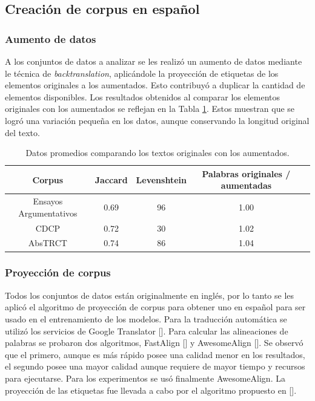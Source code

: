 \subsection{Creación de corpus en español}

\subsubsection{Aumento de datos}

A los conjuntos de datos a analizar se les realizó un aumento de datos mediante le técnica de \emph{backtranslation},
aplicándole la proyección de etiquetas de los elementos originales a los aumentados.
Esto contribuyó a duplicar la cantidad de elementos disponibles. Los resultados obtenidos al comparar los 
elementos originales con los aumentados se reflejan en la Tabla \ref{table:data_augmentation}.
Estos muestran que se logró una variación pequeña en los datos, aunque conservando la 
longitud original del texto. 

\begin{table}[h!]
	\begin{center}
		\begin{tabular}{|c|c|c|c|c|} \hline
		Corpus		            &  Jaccard	& Levenshtein	& Palabras originales / aumentadas   \\ \hline
        Ensayos Argumentativos	&  0.69		                & 96		                    & 1.00	  \\ \hline
		CDCP                    &  0.72	                    & 30		                    & 1.02	  \\ \hline
        AbsTRCT                 &  0.74		                & 86		                    & 1.04	  \\ \hline
		\end{tabular}
	\caption{Datos promedios comparando los textos originales con los aumentados.}\label{table:data_augmentation}
	\end{center}
\end{table}

\subsubsection{Proyección de corpus}

Todos los conjuntos de datos están originalmente en inglés, por lo tanto se les aplicó el algoritmo de proyección
de corpus para obtener uno en español para ser usado en el entrenamiento de los modelos. 
Para la traducción automática se utilizó los servicios de Google Translator [\cite{translateGoogle}]. Para calcular las 
alineaciones de palabras se probaron dos algoritmos, FastAlign [\cite{dyer2013fastalign}] y AwesomeAlign 
[\cite{dou2021word}]. Se observó que el primero, aunque es más rápido posee una calidad menor en los resultados,
el segundo posee una mayor calidad aunque requiere de mayor tiempo y recursos para ejecutarse. Para los experimentos
se usó finalmente AwesomeAlign. La proyección de las etiquetas fue llevada a cabo por el algoritmo propuesto 
en [\cite{eger2018cross}].

